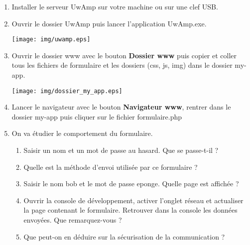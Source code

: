 \documentclass[11pt,a4paper]{article}
\begin{document}
\begin{enumerate}
\item Installer le serveur UwAmp sur votre machine ou sur une clef USB.
\item Ouvrir le dossier \textsf{UwAmp} puis lancer l'application \textsf{UwAmp.exe}.

\begin{center}
\texttt{[image: img/uwamp.eps]}
\end{center}

\newpage
\item Ouvrir le dossier \textsf{www} avec le bouton \textbf{Dossier www} puis copier et coller tous les fichiers de formulaire et les dossiers (css, js, img) dans le dossier \textsf{my-app}.
\begin{center}
\texttt{[image: img/dossier\_my\_app.eps]}
\end{center}

\item Lancer le navigateur avec le bouton \textbf{Navigateur www}, rentrer dans le dossier \textsf{my-app} puis cliquer sur le fichier \textsf{formulaire.php}



\item On va étudier le comportement du formulaire.
\begin{enumerate}
\item Saisir un nom et un mot de passe au hasard. Que se passe-t-il ? \vspace{2cm}

\item Quelle est la méthode d'envoi utilisée par ce formulaire ?\vspace{2cm}


\item Saisir le nom \textsf{bob} et le mot de passe \textsf{eponge}. Quelle page est affichée ? \vspace{2cm}

\item Ouvrir la console de développement, activer l'onglet réseau et actualiser la page contenant le formulaire. Retrouver dans la console les données envoyées. Que remarquez-vous ?\vspace{2cm}

\item Que peut-on en déduire sur la sécurisation de la communication ?\vspace{2cm}
\end{enumerate}



\end{enumerate}
\end{document}
